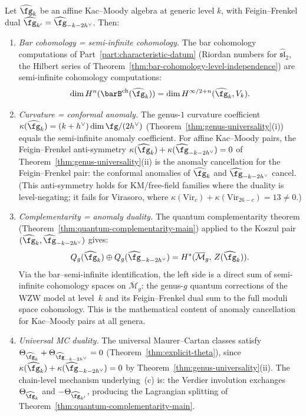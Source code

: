 \begin{corollary}
\label{cor:anomaly-duality-km-vol1}
Let $\widehat{\fg}_k$ be an affine Kac--Moody algebra at generic
level $k$, with Feigin--Frenkel dual
$\widehat{\fg}_{k'} = \widehat{\fg}_{-k-2h^\vee}$. Then:
\begin{enumerate}[label=\textup{(\alph*)}]
\item \emph{Bar cohomology = semi-infinite cohomology.}
The bar cohomology computations of
Part~\ref{part:characteristic-datum} \textup{(}Riordan numbers for
$\widehat{\mathfrak{sl}}_2$, the Hilbert series of
Theorem~\textup{\ref{thm:bar-cohomology-level-independence})}
are semi-infinite cohomology computations:
\[
\dim H^n(\barB^{\mathrm{ch}}(\widehat{\fg}_k))
= \dim H^{\infty/2+n}(\widehat{\fg}_k, V_k).
\]

\item \emph{Curvature = conformal anomaly.}
The genus-$1$ curvature coefficient
$\kappa(\widehat{\fg}_k) = (k+h^\vee)\dim\fg/(2h^\vee)$
\textup{(}Theorem~\textup{\ref{thm:genus-universality}(i))} equals
the semi-infinite anomaly coefficient. For affine Kac--Moody pairs,
the Feigin--Frenkel anti-symmetry
$\kappa(\widehat{\fg}_k) + \kappa(\widehat{\fg}_{-k-2h^\vee}) = 0$
of Theorem~\textup{\ref{thm:genus-universality}(ii)} is the
anomaly cancellation for the Feigin--Frenkel pair: the
conformal anomalies of $\widehat{\fg}_k$ and
$\widehat{\fg}_{-k-2h^\vee}$ cancel.
\textup{(}This anti-symmetry holds for KM/free-field families where the
duality is level-negating; it fails for Virasoro, where
$\kappa(\mathrm{Vir}_c) + \kappa(\mathrm{Vir}_{26-c}) = 13 \neq 0$.\textup{)}

\item \emph{Complementarity = anomaly duality.}
The quantum complementarity theorem
\textup{(}Theorem~\textup{\ref{thm:quantum-complementarity-main})}
applied to the Koszul pair
$(\widehat{\fg}_k, \widehat{\fg}_{-k-2h^\vee})$ gives:
\[
Q_g(\widehat{\fg}_k) \oplus Q_g(\widehat{\fg}_{-k-2h^\vee})
= H^*(\overline{\mathcal{M}}_g,\, Z(\widehat{\fg}_k)).
\]
Via the bar--semi-infinite identification, the left side is a
direct sum of semi-infinite cohomology spaces on
$\overline{\mathcal{M}}_g$: the genus-$g$ quantum corrections
of the WZW model at level~$k$ and its Feigin--Frenkel dual sum to
the full moduli space cohomology. This is the mathematical
content of anomaly cancellation for Kac--Moody pairs at all genera.

\item \emph{Universal MC duality.}
The universal Maurer--Cartan classes satisfy
$\Theta_{\widehat{\fg}_k} + \Theta_{\widehat{\fg}_{-k-2h^\vee}}
= 0$ (Theorem~\ref{thm:explicit-theta}), since
$\kappa(\widehat{\fg}_k) + \kappa(\widehat{\fg}_{-k-2h^\vee}) = 0$
by Theorem~\ref{thm:genus-universality}(ii).
The chain-level mechanism underlying~(c) is:
the Verdier involution exchanges
$\Theta_{\widehat{\fg}_k}$ and $-\Theta_{\widehat{\fg}_{k'}}$,
producing the Lagrangian splitting of
Theorem~\ref{thm:quantum-complementarity-main}.
\end{enumerate}
\end{corollary}

